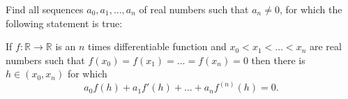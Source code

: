 Find all sequences $a_{0}, a_{1},\ldots, a_{n}$ of real numbers such that $a_{n}\neq 0$, for which the following statement is true:

If $f: \mathbb{R}\to\mathbb{R}$ is an $n$ times differentiable function
and $x_{0}<x_{1}<\ldots <x_{n}$ are real numbers such that
$f(x_{0})=f(x_{1})=\ldots =f(x_{n})=0$ then there is $h\in (x_{0}, x_{n})$ for which \[a_{0}f(h)+a_{1}f'(h)+\ldots+a_{n}f^{(n)}(h)=0.\]